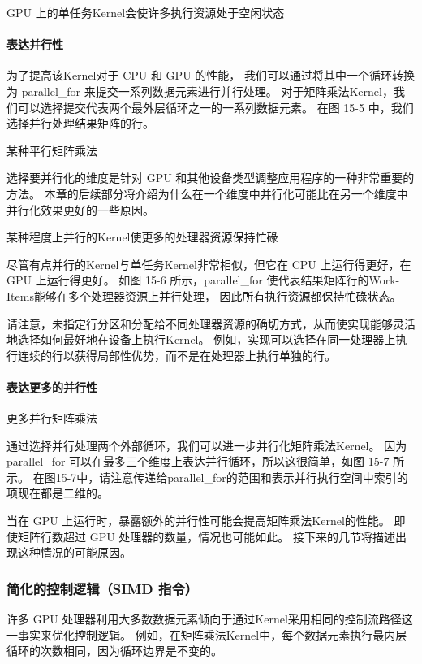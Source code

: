 {\color{red} GPU 上的单任务Kernel会使许多执行资源处于空闲状态}

\paragraph{表达并行性}

为了提高该Kernel对于 CPU 和 GPU 的性能，
我们可以通过将其中一个循环转换为 parallel\_for 来提交一系列数据元素进行并行处理。 
对于矩阵乘法Kernel，我们可以选择提交代表两个最外层循环之一的一系列数据元素。 
在图 15-5 中，我们选择并行处理结果矩阵的行。

{\color{red} 某种平行矩阵乘法}

\begin{remark}[选择如何并行化]
选择要并行化的维度是针对 GPU 和其他设备类型调整应用程序的一种非常重要的方法。
本章的后续部分将介绍为什么在一个维度中并行化可能比在另一个维度中并行化效果更好的一些原因。
\end{remark}

{\color{red} 某种程度上并行的Kernel使更多的处理器资源保持忙碌}

尽管有点并行的Kernel与单任务Kernel非常相似，但它在 CPU 上运行得更好，在 GPU 上运行得更好。 
如图 15-6 所示，parallel\_for 使代表结果矩阵行的Work-Items能够在多个处理器资源上并行处理，
因此所有执行资源都保持忙碌状态。

请注意，未指定行分区和分配给不同处理器资源的确切方式，从而使实现能够灵活地选择如何最好地在设备上执行Kernel。 
例如，实现可以选择在同一处理器上执行连续的行以获得局部性优势，而不是在处理器上执行单独的行。

\paragraph{表达更多的并行性}

{\color{red} 更多并行矩阵乘法}

通过选择并行处理两个外部循环，我们可以进一步并行化矩阵乘法Kernel。 
因为 parallel\_for 可以在最多三个维度上表达并行循环，所以这很简单，如图 15-7 所示。 
在图15-7中，请注意传递给parallel\_for的范围和表示并行执行空间中索引的项现在都是二维的。

当在 GPU 上运行时，暴露额外的并行性可能会提高矩阵乘法Kernel的性能。 
即使矩阵行数超过 GPU 处理器的数量，情况也可能如此。 接下来的几节将描述出现这种情况的可能原因。

\subsubsection{简化的控制逻辑（SIMD 指令）}
许多 GPU 处理器利用大多数数据元素倾向于通过Kernel采用相同的控制流路径这一事实来优化控制逻辑。 
例如，在矩阵乘法Kernel中，每个数据元素执行最内层循环的次数相同，因为循环边界是不变的。

